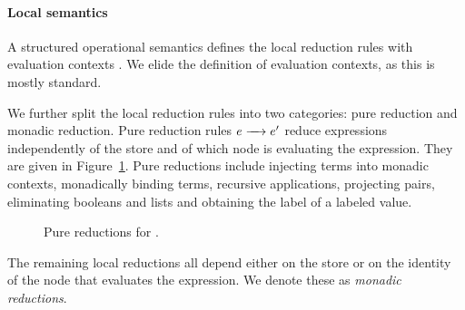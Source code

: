 \paragraph{Local semantics}
A structured operational semantics defines the local reduction rules with evaluation contexts \cite{Felleisen:1988:TPF:73560.73576}. We elide the definition of evaluation contexts, as this is mostly standard.

We further split the local reduction rules into two categories: pure reduction and monadic reduction. Pure reduction rules $\steppure{\expr}{\expr'}$ reduce expressions independently of the store and of which node is evaluating the expression. They are given in Figure~\ref{fig:pure-reductions}. Pure reductions include injecting terms into monadic contexts, monadically binding terms, recursive applications, projecting pairs, eliminating booleans and lists and obtaining the label of a labeled value.

\begin{figure}
    \centering
    \caption{Pure reductions for \lang.}
    \label{fig:pure-reductions}
\end{figure}

The remaining local reductions all depend either on the store or on the identity of the node that evaluates the expression. We denote these as \emph{monadic reductions}.

